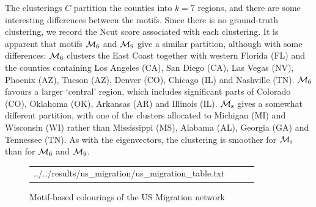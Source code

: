 The clusterings $C$ partition the counties into $k=7$ regions, and there are some interesting differences between the motifs.
Since there is no ground-truth clustering, we record the Ncut score associated with each clustering.
It is apparent that motifs $\mathcal{M}_6$ and $\mathcal{M}_9$ give a similar partition, although with some differences:
$\mathcal{M}_6$ clusters the East Coast together with western Florida (FL) and the counties containing Los Angeles (CA), San Diego (CA), Las Vegas (NV), Phoenix (AZ), Tucson (AZ), Denver (CO), Chicago (IL) and Nashville (TN).
$\mathcal{M}_6$ favours a larger `central' region, which includes significant parts of Colorado (CO), Oklahoma (OK), Arkansas (AR) and Illinois (IL).		
$\mathcal{M}_\mathrm{s}$ gives a somewhat different partition, with one of the clusters allocated to Michigan (MI) and Wisconsin (WI) rather than Mississippi (MS), Alabama (AL), Georgia (GA) and Tennessee (TN). As with the eigenvectors, the clustering is smoother for $\mathcal{M}_\mathrm{s}$ than for $\mathcal{M}_6$ and $\mathcal{M}_9$.





\pagebreak

\vspace*{-1cm}
\begin{figure}[H]
	\begin{table}[H]
		\centering
		\setlength{\tabcolsep}{0em}
		\begin{tabular}{ |c|c|c|c| }
			\expandableinput ../../results/us_migration/us_migration_table.txt
		\end{tabular}
	\end{table}
	\vspace*{-0.5cm}
	\caption{Motif-based colourings of the US Migration network}
	\label{fig:us_migration}
\end{figure}


	







